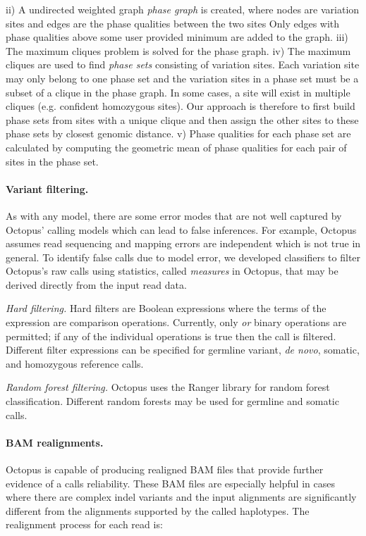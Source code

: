 \documentclass[notitlepage, twocolumn, 10pt]{article}
\begin{document}
ii) A undirected weighted graph \emph{phase graph} is created, where nodes are variation sites and edges are the phase qualities between the two sites Only edges with phase qualities above some user provided minimum are added to the graph. iii) The maximum cliques problem is solved for the phase graph. iv) The maximum cliques are used to find \emph{phase sets} consisting of variation sites. Each variation site may only belong to one phase set and the variation sites in a phase set must be a subset of a clique in the phase graph. In some cases, a site will exist in multiple cliques (e.g. confident homozygous sites). Our approach is therefore to first build phase sets from sites with a unique clique and then assign the other sites to these phase sets by closest genomic distance. v) Phase qualities for each phase set are calculated by computing the geometric mean of phase qualities for each pair of sites in the phase set.

\paragraph*{Variant filtering.} As with any model, there are some error modes that are not well captured by Octopus’ calling models which can lead to false inferences. For example, Octopus assumes read sequencing and mapping errors are independent which is not true in general. To identify false calls due to model error, we developed classifiers to filter Octopus’s raw calls using statistics, called \emph{measures} in Octopus, that may be derived directly from the input read data.

\vspace{3mm}
\noindent\emph{Hard filtering.} Hard filters are Boolean expressions where the terms of the expression are comparison operations. Currently, only \emph{or} binary operations are permitted; if any of the individual operations is true then the call is filtered. Different filter expressions can be specified for germline variant, \textit{de novo}, somatic, and homozygous reference calls.

\vspace{3mm}
\noindent\emph{Random forest filtering.} Octopus uses the Ranger library \cite{RN564} for random forest classification. Different random forests may be used for germline and somatic calls.

\paragraph*{BAM realignments.} Octopus is capable of producing realigned BAM files that provide further evidence of a calls reliability. These BAM files are especially helpful in cases where there are complex indel variants and the input alignments are significantly different from the alignments supported by the called haplotypes. The realignment process for each read is:
\end{document}
